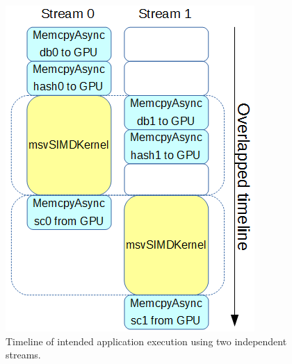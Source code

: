 \begin{figure}[!htb]
	\centering
	\includegraphics[totalheight=0.32\textheight]{Figures/streams.png}
	\caption{\selectfont Timeline of intended application execution using two independent streams.}
	\label{fig:streams}
\end{figure}
% 
% 
% 

